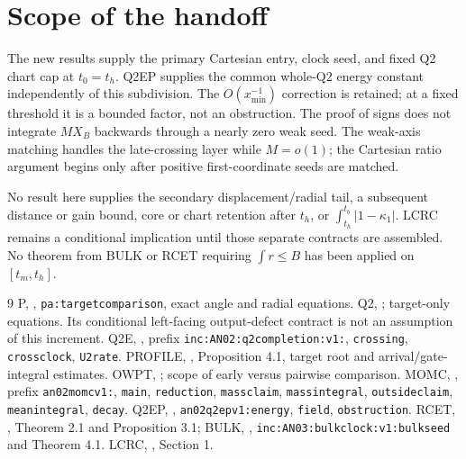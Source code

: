 \documentclass[11pt]{article}
\theoremstyle{remark}\newtheorem{remark}[theorem]{Remark}
\begin{document}
\section{Scope of the handoff}
The new results supply the primary Cartesian entry, clock seed,
and fixed Q2 chart cap at $t_0=t_h$. Q2EP supplies the common
whole-Q2 energy constant independently of this subdivision.
The $O(x_{\min}^{-1})$ correction is retained; at a fixed
threshold it is a bounded factor, not an obstruction.
The proof of signs does not integrate $M X_B$ backwards through
a nearly zero weak seed. The weak-axis matching handles the
late-crossing layer while $M=o(1)$; the Cartesian ratio argument
begins only after positive first-coordinate seeds are matched.

No result here supplies the secondary displacement/radial tail,
a subsequent distance or gain bound, core or chart retention
after $t_h$, or $\int_{t_h}^{t_b}|1-\kappa_1|$.
LCRC remains a conditional implication until those separate
contracts are assembled. No theorem from BULK or RCET requiring
$\int r\le B$ has been applied on $[t_m,t_h]$.

\begin{thebibliography}{9}\small
{} P, ,
\texttt{pa:targetcomparison}, exact angle and radial equations.
 Q2, ;
target-only equations. Its conditional left-facing output-defect
contract is not an assumption of this increment.
 Q2E, ,
prefix \texttt{inc:AN02:q2completion:v1:}, \texttt{crossing},
\texttt{crossclock}, \texttt{U2rate}.
 PROFILE,
,
Proposition 4.1, target root and arrival/gate-integral estimates.
 OWPT, ;
scope of early versus pairwise comparison.
 MOMC, ,
prefix \texttt{an02momcv1:}, \texttt{main}, \texttt{reduction},
\texttt{massclaim}, \texttt{massintegral}, \texttt{outsideclaim},
\texttt{meanintegral}, \texttt{decay}.
 Q2EP, ,
\texttt{an02q2epv1:energy}, \texttt{field}, \texttt{obstruction}.
 RCET,
,
Theorem 2.1 and Proposition 3.1;
BULK, ,
\texttt{inc:AN03:bulkclock:v1:bulkseed} and Theorem 4.1.
 LCRC,
, Section 1.
\end{thebibliography}
\end{document}
